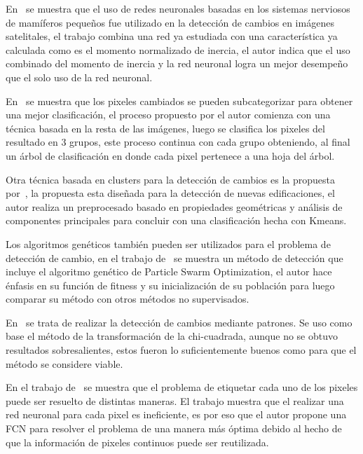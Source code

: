 




En~\cite{Zhong2015} se muestra que el uso de redes neuronales basadas en los sistemas nerviosos de mamíferos pequeños fue utilizado en la detección de cambios en imágenes satelitales, el trabajo combina una red ya estudiada con una característica ya calculada como es el momento normalizado de inercia, el autor indica que el uso combinado del momento de inercia y la red neuronal logra un mejor desempeño que el solo uso de la red neuronal.


En~\cite{SicongLiu2015} se muestra que los pixeles cambiados se pueden subcategorizar para obtener una mejor clasificación, el proceso propuesto por el autor comienza con una técnica basada en la resta de las imágenes, luego se clasifica los pixeles del resultado en 3 grupos, este proceso continua con cada grupo obteniendo, al final un árbol de clasificación en donde cada pixel pertenece a una hoja del árbol.



Otra técnica basada en clusters para la detección de cambios es la propuesta por~\cite{Leichtle2017}, la propuesta esta diseñada para la detección de nuevas edificaciones, el autor realiza un preprocesado basado en propiedades geométricas y análisis de componentes principales para concluir con una clasificación hecha con Kmeans.


Los algoritmos genéticos también pueden ser utilizados para el problema de detección de cambio, en el trabajo de~\cite{Kusetogullari2015} se muestra un método de detección que incluye el algoritmo genético de Particle Swarm Optimization, el autor hace énfasis en su función de fitness y su inicialización de su población para luego comparar su método con otros métodos no supervisados.

En~\cite{Vazquez-Jimenez2017} se trata de realizar la detección de cambios mediante patrones. Se uso como base el método de la transformación de la chi-cuadrada, aunque no se obtuvo resultados sobresalientes, estos fueron lo suficientemente buenos como para que el método se considere viable.

En el trabajo de~\cite{Maggiori2017} se muestra que el problema de etiquetar cada uno de los pixeles puede ser resuelto de distintas maneras. El trabajo muestra que el realizar una red neuronal para cada pixel es ineficiente, es por eso que el autor propone una \gls{FCN} para resolver el problema de una manera más óptima debido al hecho de que la información de pixeles continuos puede ser reutilizada.

